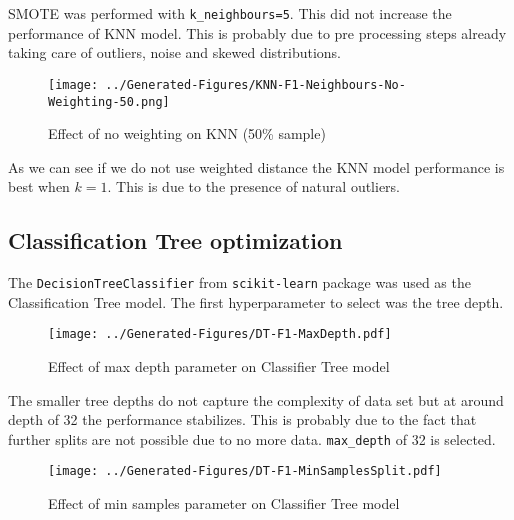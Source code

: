 \documentclass[conference]{IEEEtran}
\begin{document}
SMOTE was performed with \texttt{k\_neighbours=5}. This did not increase the performance of KNN model. This is probably due to pre processing steps already taking care of outliers, noise and skewed distributions.

\begin{figure}[H]
	\centering
	\begin{minipage}{0.45\textwidth}
		\centering
		\texttt{[image: ../Generated-Figures/KNN-F1-Neighbours-No-Weighting-50.png]}
		\caption{Effect of no weighting on KNN (50\% sample)}
		\label{fig:smote}
	\end{minipage}
\end{figure}

As we can see if we do not use weighted distance the KNN model performance is best when $k=1$. This is due to the presence of natural outliers. 

\subsection{Classification Tree optimization}

The \texttt{DecisionTreeClassifier} from \texttt{scikit-learn} package was used as the Classification Tree model. The first hyperparameter to select was the tree depth.

\begin{figure}[H]
	\centering
	\begin{minipage}{0.45\textwidth}
		\centering
		\texttt{[image: ../Generated-Figures/DT-F1-MaxDepth.pdf]}
		\caption{Effect of max depth parameter on Classifier Tree model}
		\label{fig:maxdepth}
	\end{minipage}
\end{figure}

The smaller tree depths do not capture the complexity of data set but at around depth of 32 the performance stabilizes. This is probably due to the fact that further splits are not possible due to no more data. \texttt{max\_depth} of 32 is selected.

\begin{figure}[H]
	\centering
	\begin{minipage}{0.45\textwidth}
		\centering
		\texttt{[image: ../Generated-Figures/DT-F1-MinSamplesSplit.pdf]}
		\caption{Effect of min samples parameter on Classifier Tree model}
		\label{fig:samplesplit}
	\end{minipage}
\end{figure}
\end{document}
